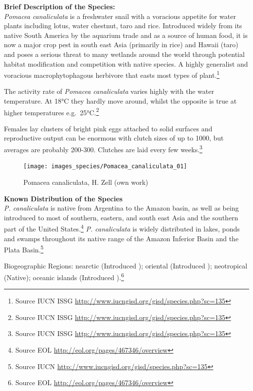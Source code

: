 \documentclass[openany]{book}
\let\rmarkdownfootnote\footnote%
\def\footnote{\protect\rmarkdownfootnote}
\theoremstyle{definition}
\theoremstyle{definition}
\theoremstyle{definition}
\theoremstyle{remark}
\begin{document}
\textbf{Brief Description of the Species:}\\
\emph{Pomacea canaliculata} is a freshwater snail with a voracious
appetite for water plants including lotus, water chestnut, taro and
rice. Introduced widely from its native South America by the aquarium
trade and as a source of human food, it is now a major crop pest in
south east Asia (primarily in rice) and Hawaii (taro) and poses a
serious threat to many wetlands around the world through potential
habitat modification and competition with native species. A highly
generalist and voracious macrophytophagous herbivore that easts most
types of plant.\footnote{Source IUCN ISSG
  \url{http://www.iucngisd.org/gisd/species.php?sc=135}}

The activity rate of \emph{Pomacea canaliculata} varies highly with the
water temperature. At 18°C they hardly move around, whilst the opposite
is true at higher temperatures e.g.~25°C.\footnote{Source IUCN ISSG
  \url{http://www.iucngisd.org/gisd/species.php?sc=135}}

Females lay clusters of bright pink eggs attached to solid surfaces and
reproductive output can be enormous with clutch sizes of up to 1000, but
averages are probably 200-300. Clutches are laid every few
weeks.\footnote{Source IUCN ISSG
  \url{http://www.iucngisd.org/gisd/species.php?sc=135}}

\begin{figure}

{\centering \texttt{[image: images\_species/Pomacea\_canaliculata\_01]} 

}

\caption{Pomacea canaliculata, H. Zell (own work)}\label{fig:unnamed-chunk-9}
\end{figure}

\textbf{Known Distribution of the Species}\\
\emph{P. canaliculata} is native from Argentina to the Amazon basin, as
well as being introduced to most of southern, eastern, and south east
Asia and the southern part of the United States.\footnote{Source EOL
  \url{http://eol.org/pages/467346/overview}} \emph{P. canaliculata} is
widely distributed in lakes, ponds and swamps throughout its native
range of the Amazon Inferior Basin and the Plata Basin.\footnote{Source
  IUCN \url{http://www.iucngisd.org/gisd/species.php?sc=135}}

Biogeographic Regions: nearctic (Introduced ); oriental (Introduced );
neotropical (Native); oceanic islands (Introduced ).\footnote{Source EOL
  \url{http://eol.org/pages/467346/overview}}
\end{document}
